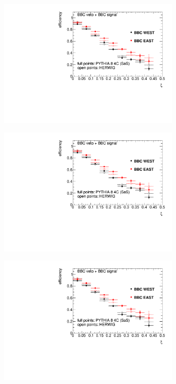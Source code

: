 \begin{figure}[t!]
	\centering
	\begin{subfigure}{.45\textwidth}
		\includegraphics[width=\textwidth,page=2]{chapters/chrgSTAR/img/bbcCorrection/xiSD_bbc.pdf}
	\end{subfigure}
	\begin{subfigure}{.45\textwidth}
		\includegraphics[width=\textwidth,page=3]{chapters/chrgSTAR/img/bbcCorrection/xiSD_bbc.pdf}
	\end{subfigure}
	\begin{subfigure}{.45\textwidth}
		\includegraphics[width=\textwidth,page=1]{chapters/chrgSTAR/img/bbcCorrection/xiSD_bbc.pdf}

\end{subfigure}
\end{figure}

